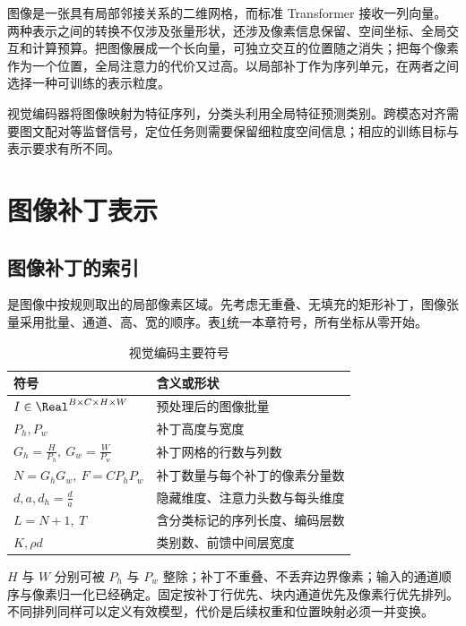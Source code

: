 \documentclass[../textbook.tex]{subfiles}
\begin{document}
\fi
{}

图像是一张具有局部邻接关系的二维网格，而标准 Transformer 接收一列向量。两种表示之间的转换不仅涉及张量形状，还涉及像素信息保留、空间坐标、全局交互和计算预算。把图像展成一个长向量，可独立交互的位置随之消失；把每个像素作为一个位置，全局注意力的代价又过高。以局部补丁作为序列单元，在两者之间选择一种可训练的表示粒度\cite{dosovitskiyImageWorth16x162022}。

视觉编码器将图像映射为特征序列，分类头利用全局特征预测类别。跨模态对齐需要图文配对等监督信号，定位任务则需要保留细粒度空间信息；相应的训练目标与表示要求有所不同。

\section{图像补丁表示}

\subsection{图像补丁的索引}
是图像中按规则取出的局部像素区域。先考虑无重叠、无填充的矩形补丁，图像张量采用批量、通道、高、宽的顺序。表\ref{tab:vision-transformer-symbols}统一本章符号，所有坐标从零开始。
\begin{table}[htbp]
\centering
\caption{视觉编码主要符号}\label{tab:vision-transformer-symbols}
\begin{tabular}{ll}
\toprule
符号 & 含义或形状\\
\midrule
$I\in\Real^{B\times C\times H\times W}$ & 预处理后的图像批量\\
$P_h,P_w$ & 补丁高度与宽度\\
$G_h=\frac{H}{P_h},\ G_w=\frac{W}{P_w}$ & 补丁网格的行数与列数\\
$N=G_hG_w,\ F=CP_hP_w$ & 补丁数量与每个补丁的像素分量数\\
$d,a,d_h=\frac{d}{a}$ & 隐藏维度、注意力头数与每头维度\\
$L=N+1,\ T$ & 含分类标记的序列长度、编码层数\\
$K,\rho d$ & 类别数、前馈中间层宽度\\
\bottomrule
\end{tabular}
\end{table}

\begin{assumption}[标准补丁化的前提]
$H$ 与 $W$ 分别可被 $P_h$ 与 $P_w$ 整除；补丁不重叠、不丢弃边界像素；输入的通道顺序与像素归一化已经确定。固定按补丁行优先、块内通道优先及像素行优先排列。不同排列同样可以定义有效模型，代价是后续权重和位置映射必须一并变换。
\end{assumption}
\end{document}
